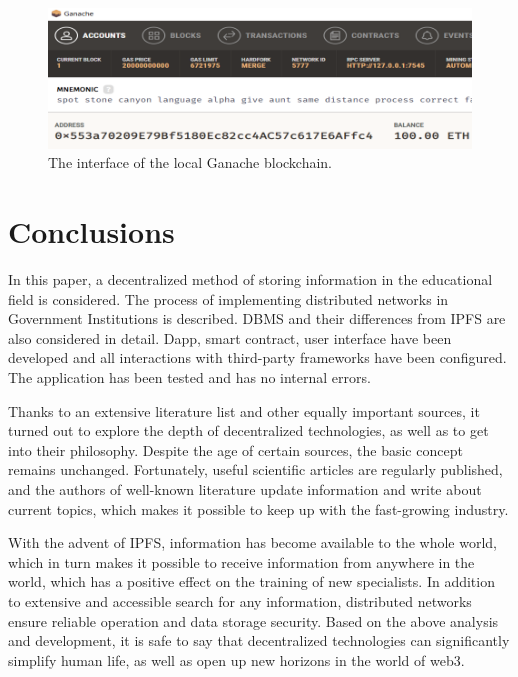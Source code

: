 \documentclass[10pt,conference,a4paper]{IEEEtran_EDM}
\begin{document}
\begin{figure}[htbp]
\centerline{\includegraphics[scale=0.51]{fig3.png}}
\caption{The interface of the local Ganache blockchain.}
\label{GanacheB}
\end{figure}

\section{Conclusions }
In this paper, a decentralized method of storing information in the educational field is considered. The process of implementing distributed networks in Government Institutions is described. DBMS and their differences from IPFS are also considered in detail. Dapp, smart contract, user interface have been developed and all interactions with third-party frameworks have been configured. The application has been tested and has no internal errors.

Thanks to an extensive literature list and other equally important sources, it turned out to explore the depth of decentralized technologies, as well as to get into their philosophy. Despite the age of certain sources, the basic concept remains unchanged. Fortunately, useful scientific articles are regularly published, and the authors of well-known literature update information and write about current topics, which makes it possible to keep up with the fast-growing industry.

With the advent of IPFS, information has become available to the whole world, which in turn makes it possible to receive information from anywhere in the world, which has a positive effect on the training of new specialists. In addition to extensive and accessible search for any information, distributed networks ensure reliable operation and data storage security.   Based on the above analysis and development, it is safe to say that decentralized technologies can significantly simplify human life, as well as open up new horizons in the world of web3.
\end{document}
